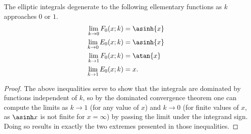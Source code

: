 \begin{lem} \label{lem:klimit}
The elliptic integrals degenerate to the following ellementary functions as $k$ approaches $0$ or $1$.
\begin{align*}
    \lim_{k\to 0} F_0(x; k) &= \asinh {x} \\
    \lim_{k\to 0} E_0(x; k) &= \asinh {x} \\
    \lim_{k\to 1} F_0(x; k) &= \atan {x} \\
    \lim_{k\to 1} E_0(x; k) &= x.
\end{align*}
\begin{proof}
The above inequalities serve to show that the integrals are dominated by functions independent of $k$, so by the dominated convergence theorem one can compute the limits as $k \to 1$ (for any value of $x$) and $k \to 0$ (for finite values of $x$, as $\asinh x$ is not finite for $x=\infty$) by passing the limit under the integrand sign. Doing so results in exactly the two extremes presented in those inequalities.
\end{proof}
\end{lem}














